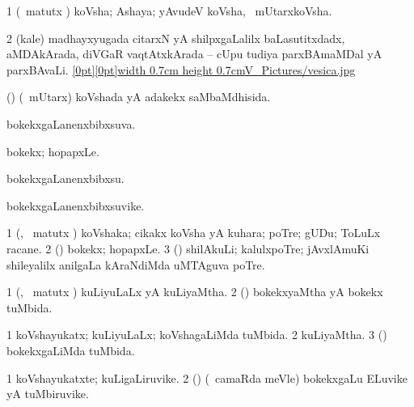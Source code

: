 {{{{\bentry
{} 
\gl{\nA}
\bmng
\bnum
\num{1} (\aMrashA\ matutx \pArxvi) koVsha; Ashaya; yAvudeV koVsha, \kanmu\ mUtarxkoVsha. 
\hypertarget{vesica(2)}{} 
\num{2} (kale) madhayxyugada citarxN yA shilpxgaLalilx baLasutitxdadx, aMDAkArada, diVGaR vaqtAtxkArada -- cUpu tudiya parxBAmaMDal yA parxBAvaLi. \quad \hyperlink{vesicafigure}{\raisebox{-0.25cm}[0pt][0pt]{\pdfimage width 0.7cm height 0.7cm{V_Pictures/vesica.jpg}}} 
\enum
\emng

\noindent 
\gl{\pagu}
\expl{}
\bmng
   
\emng
\eentry

\bentry 
{}
\gl{\gu}
\bmng
(\aMrashA) (\kanmu\ mUtarx) koVshada yA adakekx saMbaMdhisida. 
\emng
\eentry

\bentry
{} 
\gl{\gu}
\expl{}
\bmng
bokekxgaLanenxbibxsuva. 
\emng
\eentry

\bentry
{} 
\gl{\nA}
\expl{}
\bmng
 bokekx; hopapxLe. 
\emng
\eentry

\bentry
{} 
\gl{\sakirx}
\expl{}
\bmng
 bokekxgaLanenxbibxsu. 
\emng
\eentry

\bentry
{} 
\gl{\nA}
\expl{}
\bmng
 bokekxgaLanenxbibxsuvike. 
\emng
\eentry

\bentry
{} 
\gl{\gu}
\expl{}
\bmng
\emng
\eentry

\bentry
{} 
\gl{\nA}
\expl{}
\bmng
\bnum
\num{1} (\aMrashA, \pArxvi\ matutx \savi) koVshaka; cikakx koVsha yA kuhara; poTre; gUDu; ToLuLx racane. 
\num{2} (\veYshA) bokekx; hopapxLe. 
\num{3} (\BUvi) shilAkuLi; kalulxpoTre; jAvxlAmuKi shileyalilx anilgaLa kAraNdiMda uMTAguva poTre. 
\enum
\emng
\eentry

\bentry
{} 
\gl{\gu}
\expl{}
\bmng
\bnum
\num{1} (\aMrashA, \pArxvi\ matutx \savi) kuLiyuLaLx yA kuLiyaMtha. 
\num{2} (\veYshA) bokekxyaMtha yA bokekx tuMbida. 
\enum
\emng
\eentry

\bentry
{} 
\gl{\gu}
\expl{}
\bmng
\bnum
\num{1} koVshayukatx; kuLiyuLaLx; koVshagaLiMda tuMbida. 
\num{2} kuLiyaMtha. 
\num{3} (\veYshA) bokekxgaLiMda tuMbida. 
\enum
\emng
\eentry

\bentry
{} 
\gl{\nA}
\expl{}
\bmng
\bnum
\num{1} koVshayukatxte; kuLigaLiruvike. 
\num{2} (\veYshA) (\kanmu\ camaRda meVle) bokekxgaLu ELuvike yA tuMbiruvike. 
\enum
\emng
\eentry

}}}}
